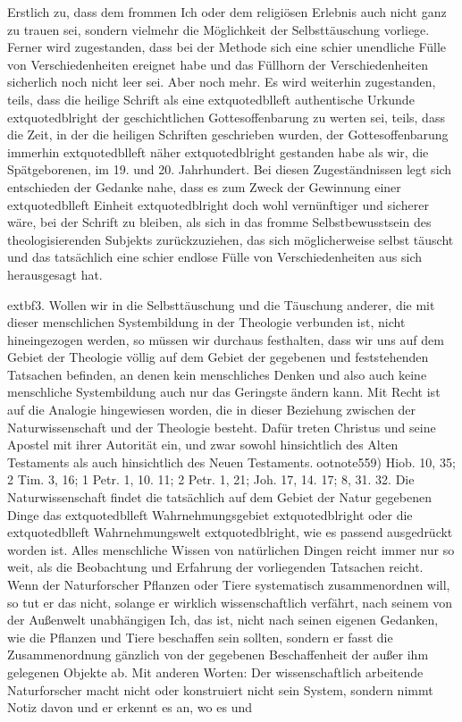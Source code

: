 Erstlich zu, dass dem frommen Ich oder dem religiösen Erlebnis auch nicht ganz zu trauen sei, sondern vielmehr die Möglichkeit der Selbsttäuschung vorliege. Ferner wird zugestanden, dass bei der Methode sich eine schier unendliche Fülle von Verschiedenheiten ereignet habe und das Füllhorn der Verschiedenheiten sicherlich noch nicht leer sei. Aber noch mehr. Es wird weiterhin zugestanden, teils, dass die heilige Schrift als eine 	extquotedblleft authentische Urkunde	extquotedblright der geschichtlichen Gottesoffenbarung zu werten sei, teils, dass die Zeit, in der die heiligen Schriften geschrieben wurden, der Gottesoffenbarung immerhin 	extquotedblleft näher	extquotedblright gestanden habe als wir, die Spätgeborenen, im 19. und 20. Jahrhundert. Bei diesen Zugeständnissen legt sich entschieden der Gedanke nahe, dass es zum Zweck der Gewinnung einer 	extquotedblleft Einheit	extquotedblright doch wohl vernünftiger und sicherer wäre, bei der Schrift zu bleiben, als sich in das fromme Selbstbewusstsein des theologisierenden Subjekts zurückzuziehen, das sich möglicherweise selbst täuscht und das tatsächlich eine schier endlose Fülle von Verschiedenheiten aus sich herausgesagt hat.


	extbf{3.} Wollen wir in die Selbsttäuschung und die Täuschung anderer, die mit dieser menschlichen Systembildung in der Theologie verbunden ist, nicht hineingezogen werden, so müssen wir durchaus festhalten, dass wir uns auf dem Gebiet der Theologie völlig auf dem Gebiet der gegebenen und feststehenden Tatsachen befinden, an denen kein menschliches Denken und also auch keine menschliche Systembildung auch nur das Geringste ändern kann. Mit Recht ist auf die Analogie hingewiesen worden, die in dieser Beziehung zwischen der Naturwissenschaft und der Theologie besteht. Dafür treten Christus und seine Apostel mit ihrer Autorität ein, und zwar sowohl hinsichtlich des Alten Testaments als auch hinsichtlich des Neuen Testaments.ootnote{559) Hiob. 10, 35; 2 Tim. 3, 16; 1 Petr. 1, 10. 11; 2 Petr. 1, 21; Joh. 17, 14. 17; 8, 31. 32.} Die Naturwissenschaft findet die tatsächlich auf dem Gebiet der Natur gegebenen Dinge das 	extquotedblleft Wahrnehmungsgebiet	extquotedblright oder die 	extquotedblleft Wahrnehmungswelt	extquotedblright, wie es passend ausgedrückt worden ist. Alles menschliche Wissen von natürlichen Dingen reicht immer nur so weit, als die Beobachtung und Erfahrung der vorliegenden Tatsachen reicht. Wenn der Naturforscher Pflanzen oder Tiere systematisch zusammenordnen will, so tut er das nicht, solange er wirklich wissenschaftlich verfährt, nach seinem von der Außenwelt unabhängigen Ich, das ist, nicht nach seinen eigenen Gedanken, wie die Pflanzen und Tiere beschaffen sein sollten, sondern er fasst die Zusammenordnung gänzlich von der gegebenen Beschaffenheit der außer ihm gelegenen Objekte ab. Mit anderen Worten: Der wissenschaftlich arbeitende Naturforscher macht nicht oder konstruiert nicht sein System, sondern nimmt Notiz davon und er erkennt es an, wo es und